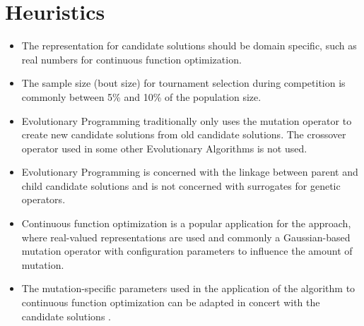 \documentclass[a4paper, 11pt]{article}
\begin{document}
\section{Heuristics}
\label{sec:heuristics}
\begin{itemize}
	\item The representation for candidate solutions should be domain specific, such as real numbers for continuous function optimization.
	\item The sample size (bout size) for tournament selection during competition is commonly between 5\% and 10\% of the population size.
	\item Evolutionary Programming traditionally only uses the mutation operator to create new candidate solutions from old candidate solutions. The crossover operator used in some other Evolutionary Algorithms is not used.
	\item Evolutionary Programming is concerned with the linkage between parent and child candidate solutions and is not concerned with surrogates for genetic operators.
	\item Continuous function optimization is a popular application for the approach, where real-valued representations are used and commonly a Gaussian-based mutation operator with configuration parameters to influence the amount of mutation.
	\item The mutation-specific parameters used in the application of the algorithm to continuous function optimization can be adapted in concert with the candidate solutions \cite{Fogel1991a}.
\end{itemize}

\end{document}
